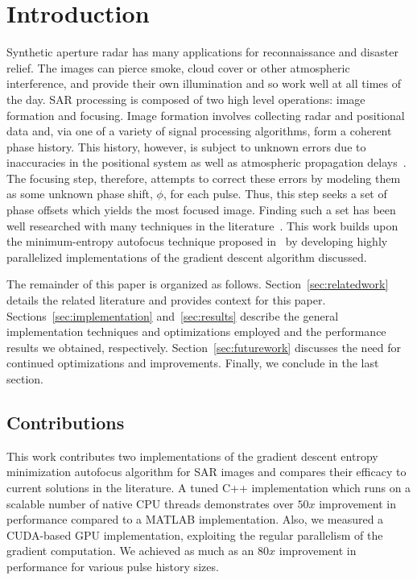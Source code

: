 \section{Introduction}\label{sec:introduction}

Synthetic aperture radar has many applications for reconnaissance and disaster
relief. The images can pierce smoke, cloud cover or other atmospheric
interference, and provide their own illumination and so work well at all times
of the day.  SAR processing is composed of two high level operations: image
formation and focusing. Image formation involves collecting radar and positional
data and, via one of a variety of signal processing algorithms, form a coherent
phase history.  This history, however, is subject to unknown errors due to
inaccuracies in the positional system as well as atmospheric propagation
delays~\cite{ash2012autofocus}. The focusing step, therefore, attempts to
correct these errors by modeling them as some unknown phase shift, $\phi$, for
each pulse. Thus, this step seeks a set of phase offsets which yields the most
focused image. Finding such a set has been well researched with many techniques
in the literature~\cite{kragh2006monotonic,
ash2012autofocus, kragh2009minimum, wahl1994phase, morrison2007sar, Eichel:89,
less_mem_high_eff_autofocus}. This work builds upon the minimum-entropy
autofocus technique proposed in~\cite{kragh2006monotonic} by developing highly
parallelized implementations of the gradient descent algorithm discussed.


The remainder of this paper is organized as follows.
Section~\ref{sec:relatedwork} details the related literature and provides
context for this paper. Sections~\ref{sec:implementation} and~\ref{sec:results}
describe the general implementation techniques and optimizations employed and
the performance results we obtained, respectively. Section~\ref{sec:futurework}
discusses the need for continued optimizations and improvements. Finally, we
conclude in the last section.

\subsection{Contributions}

This work contributes two implementations of the gradient descent entropy
minimization autofocus algorithm for SAR images and compares their efficacy to
current solutions in the literature. A tuned C++ implementation which runs on a
scalable number of native CPU threads demonstrates over $50x$ improvement in
performance compared to a MATLAB implementation. Also, we measured a CUDA-based
GPU implementation, exploiting the regular parallelism of the gradient
computation. We achieved as much as an $80x$ improvement in performance for
various pulse history sizes.
